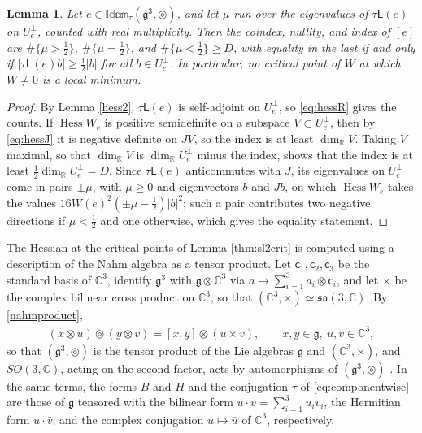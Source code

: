 \documentclass [leqno, 10pt]{amsart}
\newtheorem{lemma}[theorem]{Lemma}%
\theoremstyle{definition}
\numberwithin{equation}{section}
\newcommand{\idem}{\mathbb{Idem}}
\newcommand{\so}{\mathfrak{so}}
\newcommand{\tmlt}{\circledcirc}
\newcommand{\hess}{\operatorname{Hess}}
\newcommand{\lin}{\mathsf{L}}
\newcommand{\g}{\mathfrak{g}}
\newcommand{\rea}{\mathbb R}
\newcommand{\com}{\mathbb C}
\newcommand{\nnorm}[1]{\lvert #1\rvert}%
\newcommand{\Usp}{U}
\newcommand{\Uperp}{\Usp^{\perp}}
\begin{document}
\begin{lemma}\label{lem:indexbound}
Let $e \in \idem_{\tau}(\g^{3}, \tmlt)$, and let $\mu$ run over the eigenvalues of $\tau\lin(e)$ on $\Uperp_{e}$, counted with real multiplicity. Then the coindex, nullity, and index of $[e]$ are $\#\{\mu > \tfrac{1}{2}\}$, $\#\{\mu = \tfrac{1}{2}\}$, and $\#\{\mu < \tfrac{1}{2}\} \geq D$, with equality in the last if and only if $\nnorm{\tau\lin(e)b} \geq \tfrac{1}{2}\nnorm{b}$ for all $b \in \Uperp_{e}$. In particular, no critical point of $W$ at which $W \neq 0$ is a local minimum.
\end{lemma}
\begin{proof}
By Lemma \ref{hess2}, $\tau\lin(e)$ is self-adjoint on $\Uperp_{e}$, so \eqref{eq:hessR} gives the counts. If $\hess W_{e}$ is positive semidefinite on a subspace $V \subset \Uperp_{e}$, then by \eqref{eq:hessJ} it is negative definite on $JV$, so the index is at least $\dim_{\rea}V$. Taking $V$ maximal, so that $\dim_{\rea}V$ is $\dim_{\rea}\Uperp_{e}$ minus the index, shows that the index is at least $\tfrac{1}{2}\dim_{\rea}\Uperp_{e} = D$. Since $\tau\lin(e)$ anticommutes with $J$, its eigenvalues on $\Uperp_{e}$ come in pairs $\pm\mu$, with $\mu \geq 0$ and eigenvectors $b$ and $Jb$, on which $\hess W_{e}$ takes the values $16W(e)^{2}(\pm\mu - \tfrac{1}{2})\nnorm{b}^{2}$; such a pair contributes two negative directions if $\mu < \tfrac{1}{2}$ and one otherwise, which gives the equality statement.
\end{proof}

The Hessian at the critical points of Lemma \ref{thm:sl2crit} is computed using a description of the Nahm algebra as a tensor product. Let $\mathsf{c}_{1}, \mathsf{c}_{2}, \mathsf{c}_{3}$ be the standard basis of $\com^{3}$, identify $\g^{3}$ with $\g \otimes \com^{3}$ via $a \mapsto \sum_{i=1}^{3}a_{i} \otimes \mathsf{c}_{i}$, and let $\times$ be the complex bilinear cross product on $\com^{3}$, so that $(\com^{3}, \times) \simeq \so(3, \com)$. By \eqref{nahmproduct},
\begin{align}\label{eq:nahmtensor}
(x \otimes u) \tmlt (y \otimes v) = [x, y] \otimes (u \times v), \qquad x, y \in \g,\ u, v \in \com^{3},
\end{align}
so that $(\g^{3}, \tmlt)$ is the tensor product of the Lie algebras $\g$ and $(\com^{3}, \times)$, and $SO(3, \com)$, acting on the second factor, acts by automorphisms of $(\g^{3}, \tmlt)$ \cite[Corollary~9.1]{Kinyon-Sagle}. In the same terms, the forms $B$ and $H$ and the conjugation $\tau$ of \eqref{eq:componentwise} are those of $\g$ tensored with the bilinear form $u \cdot v = \sum_{i=1}^{3}u_{i}v_{i}$, the Hermitian form $u \cdot \bar{v}$, and the complex conjugation $u \mapsto \bar{u}$ of $\com^{3}$, respectively.
\end{document}
